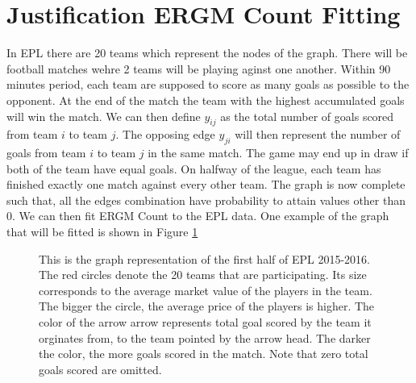 \documentclass[12pt,a4paper,twoside,openany]{book}\usepackage[]{graphicx}\usepackage[]{color}
\makeatletter
\newenvironment{kframe}{%
 \def\at@end@of@kframe{}%
 \ifinner\ifhmode%
  \def\at@end@of@kframe{\end{minipage}}%
  \begin{minipage}{\columnwidth}%
 \fi\fi%
 \def\FrameCommand##1{\hskip\@totalleftmargin \hskip-\fboxsep
 \colorbox{shadecolor}{##1}\hskip-\fboxsep
     \hskip-\linewidth \hskip-\@totalleftmargin \hskip\columnwidth}%
 \MakeFramed {\advance\hsize-\width
   \@totalleftmargin\z@ \linewidth\hsize
   \@setminipage}}%
 {\par\unskip\endMakeFramed%
 \at@end@of@kframe}
\newenvironment{knitrout}{}{} %
\makeatother
\begin{document}
\section{Justification ERGM Count Fitting}

In EPL there are 20 teams which represent the nodes of the graph. There will be football matches wehre 2 teams will be playing aginst one another. 
Within 90 minutes period, each team are supposed to score as many goals as possible to the opponent.
At the end of the match the team with the highest accumulated goals will win the match. 
We can then define $y_{ij}$ as the total number of goals scored from team $i$ to team $j$.
The opposing edge $y_{ji}$ will then represent the number of goals from team $i$ to team $j$ in the same match. 
The game may end up in draw if both of the team have equal goals.
On halfway of the league, each team has finished exactly one match against every other team. 
The graph is now complete such that, all the edges combination have probability to attain values other than 0. 
We can then fit ERGM Count to the EPL data.
One example of the graph that will be fitted is shown in Figure \ref{fig:EPL2015}

\begin{figure}[H]
\begin{knitrout}
\color{fgcolor}\begin{kframe}


{\ttfamily\noindent\bfseries{}}

{\ttfamily\noindent\bfseries\color{errorcolor}{\#\# Error in plot(nonzero, layout = layout\_in\_circle, vertex.label.dist = 0.8, : object 'nonzero' not found}}

{\ttfamily\noindent\bfseries{}}\end{kframe}
\end{knitrout}
\caption [Graph Representation of a Football League]{This is the graph representation of the first half of EPL 2015-2016. The red circles denote the 20 teams that are participating. Its size corresponds to the average market value of the players in the team. The bigger the circle, the average price of the players is higher. The color of the arrow arrow represents total goal scored by the team it orginates from, to the team pointed by the arrow head. The darker the color, the more goals scored in the match. Note that zero total goals scored are omitted.}
\label{fig:EPL2015}
\end{figure}
\end{document}

